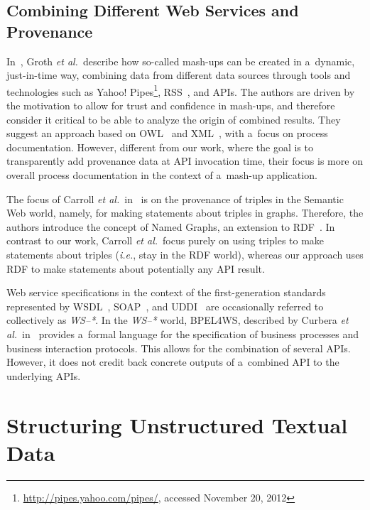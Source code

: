 \subsection{Combining Different Web Services and Provenance}

In~\cite{groth2009mashups}, Groth \emph{et al.}\
describe how so-called mash-ups can be created in a~dynamic,
just-in-time way, combining data from different data sources
through tools and technologies such as
Yahoo! Pipes\footnote{\url{http://pipes.yahoo.com/pipes/},
accessed November 20, 2012},
RSS~\cite{cadenhead2006rss}, and APIs.
The authors are driven by the motivation to allow for trust
and confidence in mash-ups, and therefore
consider it critical to be able to analyze the origin
of combined results.
They suggest an approach based on OWL~\cite{mcguinness2004owl}
and XML~\cite{bray2008xml},
with a~focus on process documentation.
However, different from our work, where the goal is to transparently
add provenance data at API invocation time,
their focus is more on overall process documentation
in the context of a~mash-up application.

The focus of Carroll \emph{et al.}\ in~\cite{carroll2005namedgraphs}
is on the provenance of triples in the Semantic Web world, namely,
for making statements about triples in graphs.
Therefore, the authors introduce the concept of Named Graphs,
an extension to RDF~\cite{klyne2004rdf}.
In contrast to our work, Carroll \emph{et al.}\
focus purely on using triples to make statements about triples
(\emph{i.e.}, stay in the RDF world),
whereas our approach uses RDF to make statements
about potentially any API result.
 
Web service specifications in the context of the 
first-generation standards represented by WSDL~\cite{christensen2001wsdl},
SOAP~\cite{gudgin2007soap}, and UDDI~\cite{sabbouh2001uddi}
are occasionally referred to collectively as \emph{WS--*}.
In the \emph{WS--*} world, BPEL4WS, described by
Curbera \emph{et al.}\ in~\cite{curbera2003bpel4ws}
provides a~formal language for the specification of
business processes and business interaction protocols.
This allows for the combination of several APIs.
However, it does not credit back concrete outputs of a~combined API
to the underlying APIs.

\section{Structuring Unstructured Textual Data} 
\label{sec:structuring}

